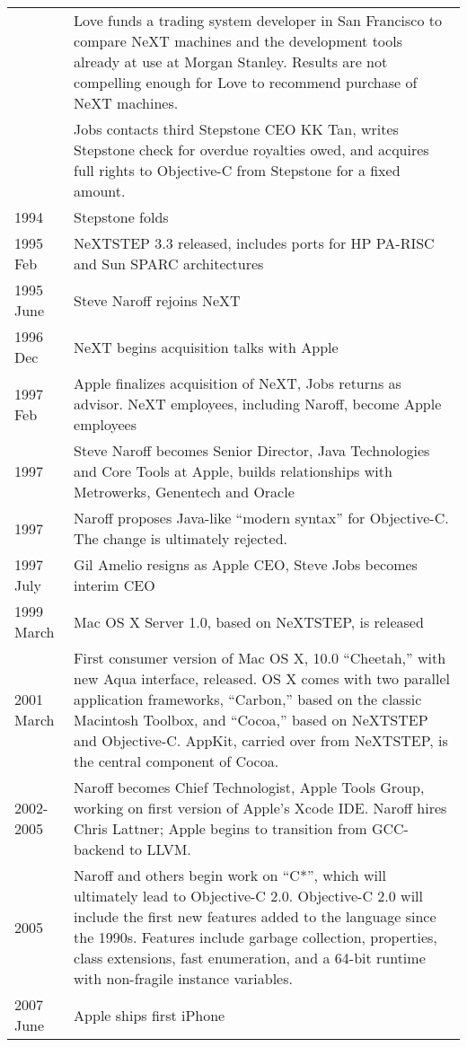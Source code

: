 \documentclass[acmsmall,screen]{acmart}
\begin{document}
\begin{longtable}{lp{4.40in}}
	& Love funds a trading system developer in San Francisco to compare NeXT machines and the development tools already at use at Morgan Stanley. Results are not compelling enough for Love to recommend purchase of NeXT machines. \\
	& Jobs contacts third Stepstone CEO KK Tan, writes Stepstone check for overdue royalties owed, and acquires full rights to Objective-C from Stepstone for a fixed amount. \\
1994 	& Stepstone folds \\
1995 Feb	& NeXTSTEP 3.3 released, includes ports for HP PA-RISC and Sun SPARC architectures \\
1995 June	& Steve Naroff rejoins NeXT \\
1996 Dec	& NeXT begins acquisition talks with Apple \\
1997 Feb	& Apple finalizes acquisition of NeXT, Jobs returns as advisor. NeXT employees, including Naroff, become Apple employees \\
1997	& Steve Naroff becomes Senior Director, Java Technologies and Core Tools at Apple, builds relationships with Metrowerks, Genentech and Oracle \\
1997	& Naroff proposes Java-like ``modern syntax'' for Objective-C. The change is ultimately rejected. \\
1997 July	& Gil Amelio resigns as Apple CEO, Steve Jobs becomes interim CEO \\
1999 March 	& Mac OS X Server 1.0, based on NeXTSTEP, is released \\
2001 March	& First consumer version of Mac OS X, 10.0 ``Cheetah,'' with new Aqua interface, released. OS X comes with two parallel application frameworks, ``Carbon,'' based on the classic Macintosh Toolbox, and ``Cocoa,'' based on NeXTSTEP and Objective-C. AppKit, carried over from NeXTSTEP, is the central component of Cocoa. \\
2002-2005	& Naroff becomes Chief Technologist, Apple Tools Group, working on first version of Apple's Xcode IDE. Naroff hires Chris Lattner; Apple begins to transition from GCC-backend to LLVM. \\
2005	& Naroff and others begin work on ``C*'', which will ultimately lead to Objective-C 2.0. Objective-C 2.0 will include the first new features added to the language since the 1990s. Features include garbage collection, properties, class extensions, fast enumeration, and a 64-bit runtime with non-fragile instance variables. \\
2007 June	& Apple ships first iPhone \\

\end{longtable}
\end{document}
